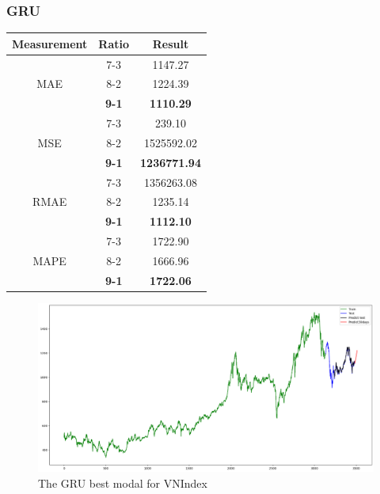 \documentclass{ieeeojies}
\begin{document}
\subsubsection{GRU}
\begin{table}[H]
    \centering
    \begin{tabular}{|c|c|c|}
        \hline
         Measurement & Ratio &  Result  \\
        \hline
             & 7-3 & 1147.27  \\
        MAE  & 8-2 & 1224.39  \\
            & \textbf{9-1} &\textbf{ 1110.29}  \\
        \hline
           & 7-3 & 239.10  \\
        MSE  & 8-2 & 1525592.02  \\
            & \textbf{9-1} & \textbf{1236771.94}  \\
        \hline
           & 7-3 & 1356263.08  \\
        RMAE  & 8-2 & 1235.14  \\
            & \textbf{9-1} & \textbf{1112.10}  \\
        \hline
           & 7-3 & 1722.90  \\
        MAPE  & 8-2 & 1666.96  \\
            & \textbf{9-1} & \textbf{1722.06}  \\
        \hline
    \end{tabular}
    \label{table:example}
\end{table}
\begin{figure}[H]
    \centering
    \includegraphics[width=0.8\linewidth]{gru-vni-91.png}
    \caption{The GRU best modal for VNIndex}
    \label{fig:example}
\end{figure}
\end{document}

